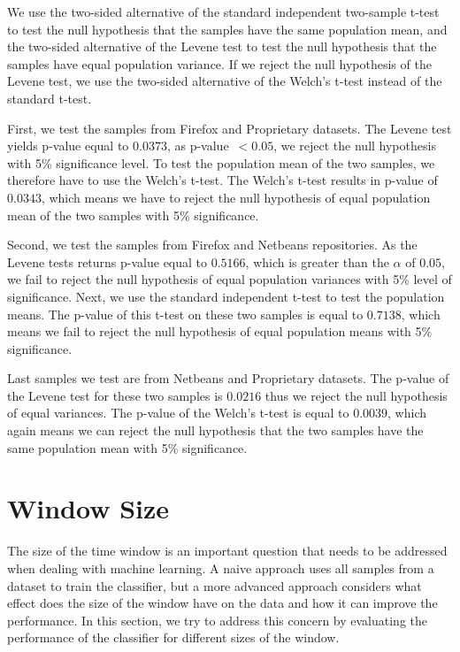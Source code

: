 We use the two-sided alternative of the standard independent two-sample t-test to test the null hypothesis that the samples have the same population mean, and the two-sided alternative of the Levene test to test the null hypothesis that the samples have equal population variance. If we reject the null hypothesis of the Levene test, we use the two-sided alternative of the Welch's t-test instead of the standard t-test.

First, we test the samples from Firefox and Proprietary datasets. The Levene test yields p-value equal to $0.0373$, as p-value~$< 0.05$, we reject the null hypothesis with 5\% significance level. To test the population mean of the two samples, we therefore have to use the Welch's t-test. The Welch's t-test results in p-value of $0.0343$, which means we have to reject the null hypothesis of equal population mean of the two samples with 5\% significance.

Second, we test the samples from Firefox and Netbeans repositories. As the Levene tests returns p-value equal to $0.5166$, which is greater than the $\alpha$ of $0.05$, we fail to reject the null hypothesis of equal population variances with 5\% level of significance. Next, we use the standard independent t-test to test the population means. The p-value of this t-test on these two samples is equal to $0.7138$, which means we fail to reject the null hypothesis of equal population means with 5\% significance.

Last samples we test are from Netbeans and Proprietary datasets. The p-value of the Levene test for these two samples is $0.0216$ thus we reject the null hypothesis of equal variances. The p-value of the Welch's t-test is equal to $0.0039$, which again means we can reject the null hypothesis that the two samples have the same population mean with 5\% significance.

\section{Window Size}

The size of the time window is an important question that needs to be addressed when dealing with machine learning. A naive approach uses all samples from a dataset to train the classifier, but a more advanced approach considers what effect does the size of the window have on the data and how it can improve the performance. In this section, we try to address this concern by evaluating the performance of the classifier for different sizes of the window.

